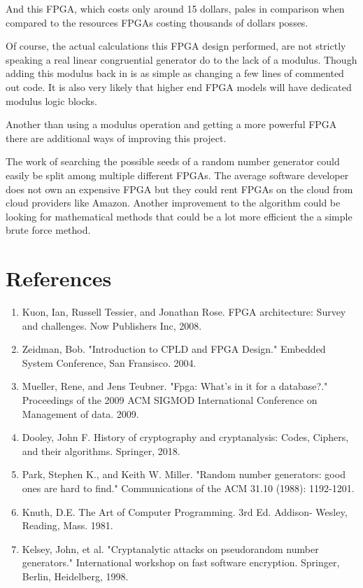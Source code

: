\documentclass{article}
\begin{document}
    And this FPGA, which costs only around 15 dollars, pales in comparison
    when compared to the resources FPGAs costing thousands of dollars posses.

    Of course, the actual calculations this FPGA design performed, are not
    strictly speaking a real linear congruential generator
    do to the lack of a modulus. Though adding this modulus back
    in is as simple as changing a few lines of commented out code.
    It is also very likely that higher end FPGA models will have
    dedicated modulus logic blocks.

    Another than using a modulus operation and getting a more powerful
    FPGA there are additional ways of improving this project.

    The work of searching the possible seeds of a random number generator
    could easily be split among multiple different FPGAs.
    The average software developer does not own an expensive FPGA
    but they could rent FPGAs on the cloud from cloud providers like Amazon.
    Another improvement to the algorithm could be looking for mathematical
    methods that could be a lot more efficient the a simple brute force method.
    
    \break
    \section*{References}

    \begin{enumerate}

    \item Kuon, Ian, Russell Tessier, and Jonathan Rose. FPGA architecture: Survey and challenges. Now Publishers Inc, 2008.
    \item Zeidman, Bob. "Introduction to CPLD and FPGA Design." Embedded System Conference, San Fransisco. 2004.
    \item Mueller, Rene, and Jens Teubner. "Fpga: What's in it for a database?." Proceedings of the 2009 ACM SIGMOD International Conference on Management of data. 2009.
    \item Dooley, John F. History of cryptography and cryptanalysis: Codes, Ciphers, and their algorithms. Springer, 2018.
    \item Park, Stephen K., and Keith W. Miller. "Random number generators: good ones are hard to find." Communications of the ACM 31.10 (1988): 1192-1201.
    \item Knuth, D.E. The Art of Computer Programming. 3rd Ed. Addison- Wesley, Reading, Mass. 1981.
    \item Kelsey, John, et al. "Cryptanalytic attacks on pseudorandom number generators." International workshop on fast software encryption. Springer, Berlin, Heidelberg, 1998.

    \end{enumerate}
    
\end{document}
